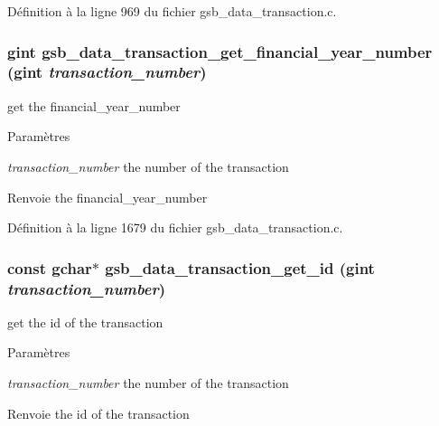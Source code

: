 Définition à la ligne 969 du fichier gsb\_\-data\_\-transaction.c.

\subsubsection[{gsb\_\-data\_\-transaction\_\-get\_\-financial\_\-year\_\-number}]{\setlength{\rightskip}{0pt plus 5cm}gint gsb\_\-data\_\-transaction\_\-get\_\-financial\_\-year\_\-number (gint {\em transaction\_\-number})}\label{gsb__data__transaction_8c_ae8f3e659e304f02abd6c2ae7dd759203}
get the financial\_\-year\_\-number 
\begin{DoxyParams}{Paramètres}
\item[{\em transaction\_\-number}]the number of the transaction \end{DoxyParams}
\begin{DoxyReturn}{Renvoie}
the financial\_\-year\_\-number 
\end{DoxyReturn}


Définition à la ligne 1679 du fichier gsb\_\-data\_\-transaction.c.

\subsubsection[{gsb\_\-data\_\-transaction\_\-get\_\-id}]{\setlength{\rightskip}{0pt plus 5cm}const gchar$\ast$ gsb\_\-data\_\-transaction\_\-get\_\-id (gint {\em transaction\_\-number})}\label{gsb__data__transaction_8c_a14a1730f01690f24ee0b884cb9654e72}
get the id of the transaction


\begin{DoxyParams}{Paramètres}
\item[{\em transaction\_\-number}]the number of the transaction\end{DoxyParams}
\begin{DoxyReturn}{Renvoie}
the id of the transaction 
\end{DoxyReturn}


